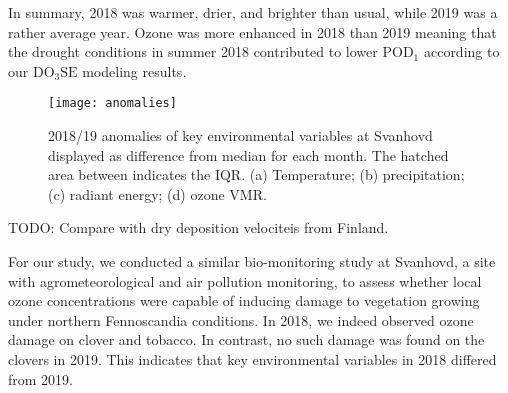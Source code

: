 \documentclass[bg, manuscript]{copernicus}
\begin{document}
In summary, 2018 was warmer, drier, and brighter than usual, while 2019 was a rather average year. Ozone was more enhanced in 2018 than 2019 meaning that the drought conditions in summer 2018 contributed to lower $\mathrm{POD_1}$ according to our $\mathrm{DO_3SE}$ modeling results.

\begin{figure*}[t]
  
  \centering
  \texttt{[image: anomalies]}
  \caption{2018/19 anomalies of key environmental variables at Svanhovd displayed as difference from median for each month. The hatched area between indicates the IQR. (a) Temperature; (b) precipitation; (c) radiant energy; (d) ozone VMR.}
  \label{fig:anomalies_svanvik}
\end{figure*}

\label{sec:conc}

TODO: Compare with dry deposition velociteis from Finland.

For our study, we conducted a similar bio-monitoring study at Svanhovd, a site with agrometeorological and air pollution monitoring, to assess whether local ozone concentrations were capable of inducing damage to vegetation growing under northern Fennoscandia conditions. In 2018, we indeed observed ozone damage on clover and tobacco. In contrast, no such damage was found on the clovers in 2019. This indicates that key environmental variables in 2018 differed from 2019.
\end{document}

